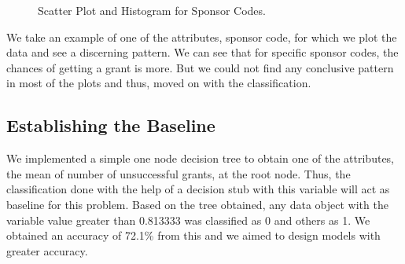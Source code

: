 \documentclass{article} %
\begin{document}
	\begin{figure}[h]
		\begin{center}
		\end{center}
		\caption{Scatter Plot and Histogram for Sponsor Codes.}
		\label{fig:sponsor}
	\end{figure}
	
	We take an example of one of the attributes, sponsor code, for which we plot the data and see a discerning pattern. We can see that for specific sponsor codes, the chances of getting a grant is more. But we could not find any conclusive pattern in most of the plots and thus, moved on with the classification.  
	
	\subsection{Establishing the Baseline}
	We implemented a simple one node decision tree to obtain one of the attributes, the mean of number of unsuccessful grants, at the root node. Thus, the classification done with the help of a decision stub with this variable will act as baseline for this problem. Based on the tree obtained, any data object with the variable value greater than 0.813333 was classified as 0 and others as 1. We obtained an accuracy of 72.1\% from this and we aimed to design models with greater accuracy.
	
\end{document}
